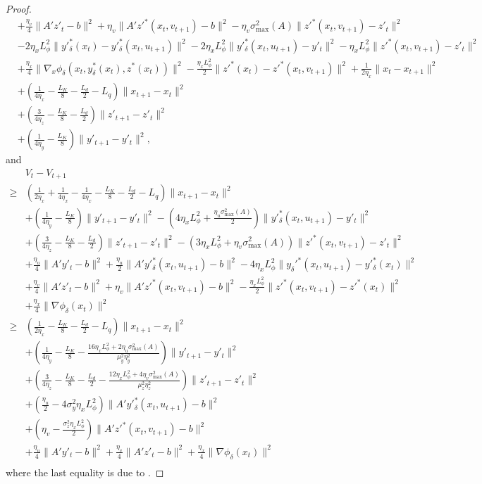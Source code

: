 \documentclass[10pt,a4paper]{amsart}
\newcommand{\pth}[1]{\left( #1 \right)}
\begin{document}
\begin{proof}
\begin{align*}
    &+\frac{\eta_v}{4}\|A'z'_t-b\|^2+\eta_v\|A'z'^*(x_{t},v_{t+1})-b\|^2-\eta_v \sigma_{\max}^2(A) \|z'^*(x_t,v_{t+1})-z'_t\|^2\\
    &-2\eta_xL_\phi^2\|y'^*_\delta(x_t)-y'^*_\delta(x_t,u_{t+1})\|^2-2\eta_xL_\phi^2\|y'^*_\delta(x_t,u_{t+1})-y'_t\|^2-\eta_xL_\phi^2\|z'^*(x_t, v_{t+1})-z'_t\|^2\\
    &+\frac{\eta_x}{4}\|\nabla_x \phi_\delta(x_t, y^*_\delta(x_t), z^*(x_t))\|^2-\frac{\eta_xL_\phi^2}{2}\|z'^*(x_t)-z'^*(x_t, v_{t+1})\|^2+\frac{1}{2\eta_x}\|x_t-x_{t+1}\|^2\\
    &+\pth{\frac{1}{4\eta_x}-\frac{L_K}{8}-\frac{L_d}{2}-L_q}\|x_{t+1}-x_t\|^2\\
    &+\pth{\frac{3}{4\eta_z}-\frac{L_K}{8}-\frac{L_d}{2}}\|z'_{t+1}-z'_t\|^2\\
    &+\pth{\frac{1}{4\eta_y}-\frac{L_K}{8}}\|y'_{t+1}-y'_t\|^2,
\end{align*}
and
\begin{align*}
    &V_t-V_{t+1}\\
    \geq&\pth{\frac{1}{2\eta_x}+\frac{1}{4\eta_x}-\frac{1}{4\eta_x}-\frac{L_K}{8}-\frac{L_d}{2}-L_q}\|x_{t+1}-x_t\|^2\\
    &+\pth{\frac{1}{4\eta_y}-\frac{L_K}{8}}\|y'_{t+1}-y'_t\|^2-\pth{4\eta_xL_\phi^2+\frac{\eta_u \sigma_{\max}^2(A)}{2}}\|y'^*_\delta(x_t,u_{t+1})-y'_t\|^2\\
    &+\pth{\frac{3}{4\eta_z}-\frac{L_K}{8}-\frac{L_d}{2}}\|z'_{t+1}-z'_t\|^2-\pth{3\eta_xL_\phi^2+\eta_v \sigma_{\max}^2(A)}\|z'^*(x_t,v_{t+1})-z'_t\|^2\\
    &+\frac{\eta_u}{4}\|A'y'_t-b\|^2+\frac{\eta_u}{2}\|A'y'^*_\delta(x_t,u_{t+1})-b\|^2-4\eta_xL_\phi^2\|y_\delta'^*(x_t,u_{t+1})-y'^*_\delta(x_t)\|^2\\
    &+\frac{\eta_v}{4}\|A'z'_t-b\|^2+\eta_v\|A'z'^*(x_t,v_{t+1})-b\|^2-\frac{\eta_xL_\phi^2}{2}\|z'^*(x_t, v_{t+1})-z'^*(x_t)\|^2\\
    &+\frac{\eta_x}{4}\|\nabla \phi_\delta(x_t)\|^2\\
    \geq&\pth{\frac{1}{2\eta_x}-\frac{L_K}{8}-\frac{L_d}{2}-L_q}\|x_{t+1}-x_t\|^2\\
    &+\pth{\frac{1}{4\eta_y}-\frac{L_K}{8}-\frac{16\eta_xL_\phi^2+2\eta_u\sigma_{\max}^2(A)}{\mu_y^2\eta_y^2}}\|y'_{t+1}-y'_t\|^2\\
    &+\pth{\frac{3}{4\eta_z}-\frac{L_K}{8}-\frac{L_d}{2}-\frac{12\eta_xL_\phi^2+4\eta_v\sigma_{\max}^2(A)}{\mu_z^2\eta_z^2}}\|z'_{t+1}-z'_t\|^2\\
    &+\pth{\frac{\eta_u}{2}-4\sigma_y^2\eta_xL_\phi^2}\|A'y'^*_\delta(x_t,u_{t+1})-b\|^2\\
    &+\pth{\eta_v-\frac{\sigma_z^2\eta_xL_\phi^2}{2}}\|A'z'^*(x_t,v_{t+1})-b\|^2\\
    &+\frac{\eta_u}{4}\|A'y'_t-b\|^2+\frac{\eta_v}{4}\|A'z'_t-b\|^2+\frac{\eta_x}{4}\|\nabla \phi_\delta(x_t)\|^2\\
\end{align*}
where the last equality is due to . 


\end{proof}
\end{document}
